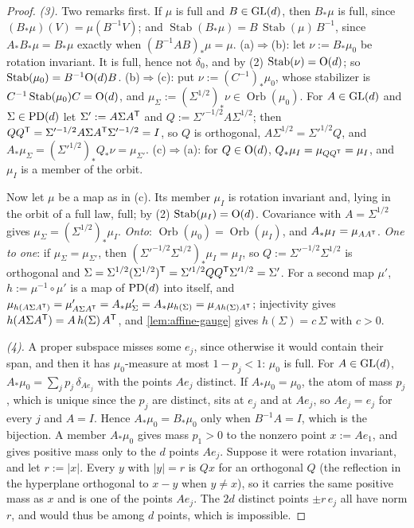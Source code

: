 \begin{proof}
\emph{(3).} Two remarks first. If $\mu$ is full and $B \in \mathrm{GL}(d)$, then $B_*\mu$ is full, since
$(B_*\mu)(V) = \mu(B^{-1}V)$; and $\operatorname{Stab}(B_*\mu) = B\,\operatorname{Stab}(\mu)\,B^{-1}$,
since $A_*B_*\mu = B_*\mu$ exactly when $(B^{-1}AB)_*\mu = \mu$.
(a)$\Rightarrow$(b): let $\nu := B_*\mu_0$ be rotation invariant. It is full, hence not $\delta_0$, and
by (2) $\operatorname{Stab}(\nu) = \mathrm{O}(d)$; so $\operatorname{Stab}(\mu_0) = B^{-1}\mathrm{O}(d)B$.
(b)$\Rightarrow$(c): put $\nu := (C^{-1})_*\mu_0$, whose stabilizer is $C^{-1}\operatorname{Stab}(\mu_0)C
= \mathrm{O}(d)$, and $\mu_\Sigma := (\Sigma^{1/2})_*\nu \in \operatorname{Orb}(\mu_0)$. For $A \in \mathrm{GL}(d)$
and $\Sigma \in \mathrm{PD}(d)$ let $\Sigma' := A\Sigma A^{\mathsf{T}}$ and $Q := \Sigma'^{-1/2}A\Sigma^{1/2}$; then
$QQ^{\mathsf{T}} = \Sigma'^{-1/2}A\Sigma A^{\mathsf{T}}\Sigma'^{-1/2} = I$, so $Q$ is orthogonal, $A\Sigma^{1/2} =
\Sigma'^{1/2}Q$, and $A_*\mu_\Sigma = (\Sigma'^{1/2})_*Q_*\nu = \mu_{\Sigma'}$.
(c)$\Rightarrow$(a): for $Q \in \mathrm{O}(d)$, $Q_*\mu_I = \mu_{QQ^{\mathsf{T}}} = \mu_I$, and $\mu_I$ is a
member of the orbit.

Now let $\mu$ be a map as in (c). Its member $\mu_I$ is rotation invariant and, lying in the orbit of
a full law, full; by (2) $\operatorname{Stab}(\mu_I) = \mathrm{O}(d)$. Covariance with $A = \Sigma^{1/2}$
gives $\mu_\Sigma = (\Sigma^{1/2})_*\mu_I$. \emph{Onto}: $\operatorname{Orb}(\mu_0) =
\operatorname{Orb}(\mu_I)$, and $A_*\mu_I = \mu_{AA^{\mathsf{T}}}$. \emph{One to one}: if $\mu_\Sigma =
\mu_{\Sigma'}$, then $(\Sigma'^{-1/2}\Sigma^{1/2})_*\mu_I = \mu_I$, so $Q := \Sigma'^{-1/2}\Sigma^{1/2}$ is
orthogonal and $\Sigma = \Sigma^{1/2}(\Sigma^{1/2})^{\mathsf{T}} = \Sigma'^{1/2}QQ^{\mathsf{T}}\Sigma'^{1/2} = \Sigma'$. For a
second map $\mu'$, $h := \mu^{-1} \circ \mu'$ is a map of $\mathrm{PD}(d)$ into itself, and
$\mu_{h(A\Sigma A^{\mathsf{T}})} = \mu'_{A\Sigma A^{\mathsf{T}}} = A_*\mu'_\Sigma = A_*\mu_{h(\Sigma)} = \mu_{Ah(\Sigma)A^{\mathsf{T}}}$;
injectivity gives $h(A\Sigma A^{\mathsf{T}}) = A\,h(\Sigma)\,A^{\mathsf{T}}$, and \ref{lem:affine-gauge} gives
$h(\Sigma) = c\,\Sigma$ with $c > 0$.

\emph{(4).} A proper subspace misses some $e_j$, since otherwise it would contain their span, and then
it has $\mu_0$-measure at most $1 - p_j < 1$: $\mu_0$ is full. For $A \in \mathrm{GL}(d)$,
$A_*\mu_0 = \sum_jp_j\,\delta_{Ae_j}$ with the points $Ae_j$ distinct. If $A_*\mu_0 = \mu_0$, the atom of
mass $p_j$, which is unique since the $p_j$ are distinct, sits at $e_j$ and at $Ae_j$, so $Ae_j = e_j$
for every $j$ and $A = I$. Hence $A_*\mu_0 = B_*\mu_0$ only when $B^{-1}A = I$, which is the bijection.
A member $A_*\mu_0$ gives mass $p_1 > 0$ to the nonzero point $x := Ae_1$, and gives positive mass
only to the $d$ points $Ae_j$. Suppose it were rotation invariant, and let $r := |x|$. Every $y$
with $|y| = r$ is $Qx$ for an orthogonal $Q$ (the reflection in the hyperplane orthogonal to
$x - y$ when $y \ne x$), so it carries the same positive mass as $x$ and is one of the points
$Ae_j$. The $2d$ distinct points $\pm r\,e_j$ all have norm $r$, and would thus be among $d$
points, which is impossible.


\end{proof}
